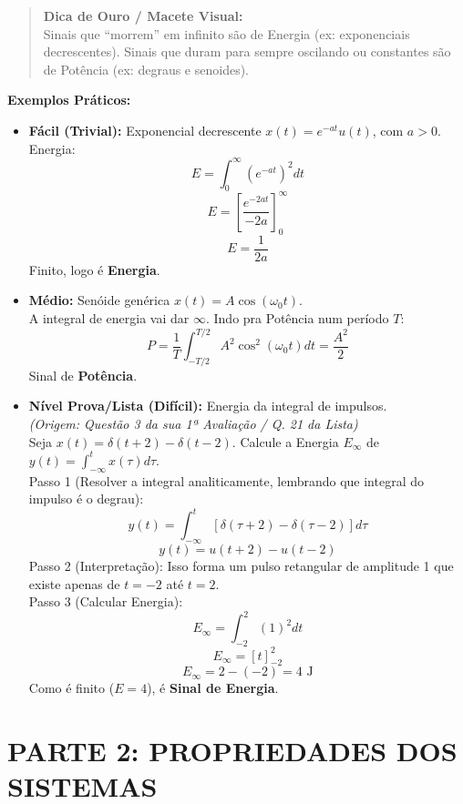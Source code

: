 \begin{quote}
\textbf{Dica de Ouro / Macete Visual:}\\
Sinais que ``morrem'' em infinito são de Energia (ex: exponenciais decrescentes). Sinais que duram para sempre oscilando ou constantes são de Potência (ex: degraus e senoides).
\end{quote}

\textbf{Exemplos Práticos:}

\begin{itemize}
\item
  \textbf{Fácil (Trivial):} Exponencial decrescente \(x(t) = e^{-at}u(t)\), com \(a > 0\).\\
  Energia:
  \[E = \int_{0}^{\infty} (e^{-at})^2 dt\]
  \[E = \left[ \frac{e^{-2at}}{-2a} \right]_{0}^{\infty}\]
  \[E = \frac{1}{2a}\]
  Finito, logo é \textbf{Energia}.
\item
  \textbf{Médio:} Senóide genérica \(x(t) = A\cos(\omega_0 t)\).\\
  A integral de energia vai dar \(\infty\). Indo pra Potência num período \(T\):
  \[P = \frac{1}{T} \int_{-T/2}^{T/2} A^2 \cos^2(\omega_0 t) dt = \frac{A^2}{2}\]
  Sinal de \textbf{Potência}.
\item
  \textbf{Nível Prova/Lista (Difícil):} Energia da integral de impulsos.\\
  \emph{(Origem: Questão 3 da sua 1ª Avaliação / Q. 21 da Lista)}\\
  Seja \(x(t) = \delta(t + 2) - \delta(t - 2)\). Calcule a Energia \(E_\infty\) de \(y(t) = \int_{-\infty}^{t} x(\tau) d\tau\).\\
  Passo 1 (Resolver a integral analiticamente, lembrando que integral do impulso é o degrau):
  \[y(t) = \int_{-\infty}^{t} [\delta(\tau + 2) - \delta(\tau - 2)] d\tau\]
  \[y(t) = u(t + 2) - u(t - 2)\]
  Passo 2 (Interpretação): Isso forma um pulso retangular de amplitude 1 que existe apenas de \(t = -2\) até \(t = 2\).\\
  Passo 3 (Calcular Energia):
  \[E_\infty = \int_{-2}^{2} (1)^2 dt\]
  \[E_\infty = [t]_{-2}^{2}\]
  \[E_\infty = 2 - (-2) = 4 \text{ J}\]
  Como é finito (\(E=4\)), é \textbf{Sinal de Energia}.
\end{itemize}

\section{PARTE 2: PROPRIEDADES DOS SISTEMAS}\label{parte-2-propriedades-dos-sistemas}

